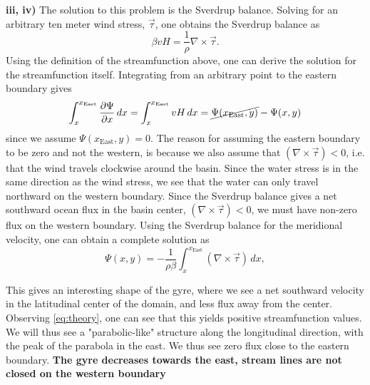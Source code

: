 \textbf{iii, iv)} The solution to this problem is the Sverdrup balance. Solving for an arbitrary ten meter wind stress, $\vec{\tau}$, one obtains the Sverdrup balance as 
\begin{equation}
    \beta v H = \frac{1}{\rho}\nabla\times\vec{\tau}.
\end{equation}
Using the definition of the streamfunction above, one can derive the solution for the streamfunction itself. Integrating from an arbitrary point to the eastern boundary gives 
\begin{equation}
\int_x^{x_\text{East}}\frac{\partial \Psi}{\partial x}\, dx = \int_x^{x_\text{East}} vH \, dx =
\cancel{\Psi(x_\text{East},y)} - \Psi(x,y)
\end{equation}
since we assume $\Psi(x_\text{East},y)=0$. The reason for assuming the eastern boundary to be zero and not the western, is because we also assume that $\left(\nabla\times\vec{\tau}\right)<0$, i.e. that the wind travels clockwise around the basin. Since the water stress is in the same direction as the wind stress, we see that the water can only travel northward on the western boundary. Since the Sverdrup balance gives a net southward ocean flux in the basin center, $\left(\nabla\times\vec{\tau}\right)<0$, we must have non-zero flux on the western boundary. Using the Sverdrup balance for the meridional velocity, one can obtain a complete solution as 
\begin{equation}
    \Psi(x,y) = -\frac{1}{\rho\beta}\int_x^{x_\text{East}} \left(\nabla\times\vec{\tau}\right) \, dx,
    \label{eq:theory}
\end{equation}

This gives an interesting shape of the gyre, where we see a net southward velocity in the latitudinal center of the domain, and less flux away from the center. Observing \autoref{eq:theory}, one can see that this yields positive streamfunction values. We will thus see a "parabolic-like" structure along the longitudinal direction, with the peak of the parabola in the east. We thus see zero flux close to the eastern boundary. 
\textbf{The gyre decreases towards the east, stream lines are not closed on the western boundary}


